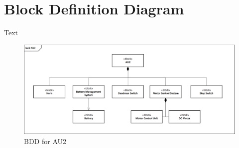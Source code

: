 \section{Block Definition Diagram}
Text

\begin{figure}[H]
	\centering
	\includegraphics[width=1\linewidth]{Architecture/Diagrams/BDD_AU2}
	\caption{BDD for AU2}
	\label{fig:BDD}
\end{figure}